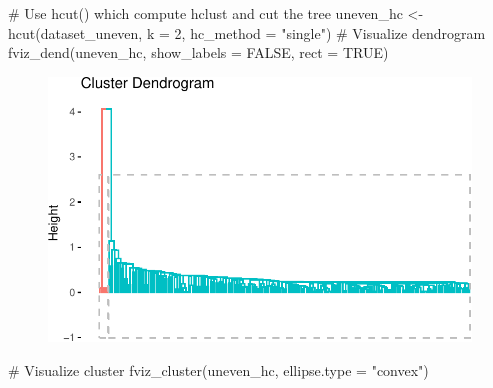 \documentclass[
  letterpaper,
  DIV=11,
  numbers=noendperiod]{scrreprt}
\newenvironment{Shaded}{\begin{snugshade}}{\end{snugshade}}
\newcommand{\AttributeTok}[1]{\textcolor[rgb]{0.40,0.45,0.13}{#1}}
\newcommand{\CommentTok}[1]{\textcolor[rgb]{0.37,0.37,0.37}{#1}}
\newcommand{\ConstantTok}[1]{\textcolor[rgb]{0.56,0.35,0.01}{#1}}
\newcommand{\DecValTok}[1]{\textcolor[rgb]{0.68,0.00,0.00}{#1}}
\newcommand{\FunctionTok}[1]{\textcolor[rgb]{0.28,0.35,0.67}{#1}}
\newcommand{\NormalTok}[1]{\textcolor[rgb]{0.00,0.23,0.31}{#1}}
\newcommand{\OtherTok}[1]{\textcolor[rgb]{0.00,0.23,0.31}{#1}}
\newcommand{\StringTok}[1]{\textcolor[rgb]{0.13,0.47,0.30}{#1}}
\begin{document}
\begin{Shaded}
\begin{Highlighting}[]
\CommentTok{\# Use hcut() which compute hclust and cut the tree}
\NormalTok{uneven\_hc }\OtherTok{\textless{}{-}} \FunctionTok{hcut}\NormalTok{(dataset\_uneven, }\AttributeTok{k =} \DecValTok{2}\NormalTok{, }\AttributeTok{hc\_method =} \StringTok{"single"}\NormalTok{)}
\CommentTok{\# Visualize dendrogram}
\FunctionTok{fviz\_dend}\NormalTok{(uneven\_hc, }\AttributeTok{show\_labels =} \ConstantTok{FALSE}\NormalTok{, }\AttributeTok{rect =} \ConstantTok{TRUE}\NormalTok{)}
\end{Highlighting}
\end{Shaded}

\begin{figure}[H]

{\centering \includegraphics{./12-clustering_files/figure-pdf/unnamed-chunk-9-1.pdf}

}

\end{figure}

\begin{Shaded}
\begin{Highlighting}[]
\CommentTok{\# Visualize cluster}
\FunctionTok{fviz\_cluster}\NormalTok{(uneven\_hc, }\AttributeTok{ellipse.type =} \StringTok{"convex"}\NormalTok{)}
\end{Highlighting}
\end{Shaded}
\end{document}
